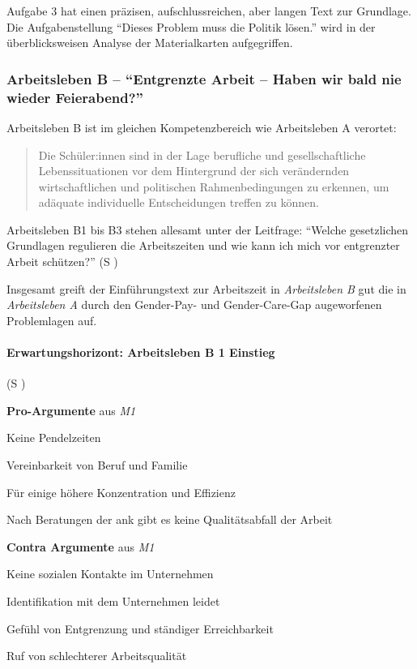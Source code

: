 Aufgabe 3 hat einen präzisen, aufschlussreichen, aber langen Text zur Grundlage. Die Aufgabenstellung \enquote{Dieses Problem muss die Politik lösen.} wird in der überblicksweisen Analyse der Materialkarten aufgegriffen. 



\subsubsection{Arbeitsleben B -- \enquote{Entgrenzte Arbeit – Haben wir bald nie wieder Feierabend?}}
Arbeitsleben B ist im gleichen Kompetenzbereich wie Arbeitsleben A verortet: 
\begin{quotation}
    Die Schüler:innen sind in der Lage berufliche und gesellschaftliche Lebenssituationen vor dem Hintergrund der sich verändernden wirtschaftlichen und politischen Rahmenbedingungen zu erkennen, um adäquate individuelle Entscheidungen treffen zu können.

    \autocite[18]{bplan}
\end{quotation}

Arbeitsleben B1 bis B3 stehen allesamt unter der Leitfrage:
\enquote{Welche gesetzlichen Grundlagen regulieren die Arbeitszeiten und wie kann ich mich vor entgrenzter Arbeit schützen?} (\gls{S} \pageref{ARBEITSLEBEN-B1})

Insgesamt greift der Einführungstext zur Arbeitszeit in \emph{Arbeitsleben B} gut die in \emph{Arbeitsleben A} durch den Gender-Pay- und Gender-Care-Gap augeworfenen Problemlagen auf. 


\paragraph{Erwartungshorizont: Arbeitsleben B 1 Einstieg} (\gls{S} \pageref{ARBEITSLEBEN-B1})
\begin{myitemize}
    \item[] \textbf{Pro-Argumente} aus \emph{M1}
    \item Keine Pendelzeiten
    \item Vereinbarkeit von Beruf und Familie
    \item Für einige höhere Konzentration und Effizienz
    \item Nach Beratungen der \gls{ank} gibt es keine Qualitätsabfall der Arbeit
    \item[]    
    \item[] \textbf{Contra Argumente} aus \emph{M1}
    \item Keine sozialen Kontakte im Unternehmen
    \item Identifikation mit dem Unternehmen leidet 
    \item Gefühl von Entgrenzung und ständiger Erreichbarkeit 
    \item Ruf von schlechterer Arbeitsqualität
\end{myitemize}

